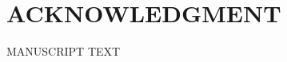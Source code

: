 \documentclass[12pt,english]{article}
\newcommand{\rrxspc}{1.5}
\begin{document}
\doublespacing
\section*{ACKNOWLEDGMENT}
\ACKNOWLEDGMENTS
\clearpage 

\setcounter{page}{1}
\renewcommand*{\thefootnote}{\arabic{footnote}}
\begingroup
  \centering
  \Large MANUSCRIPT TEXT\\[1em]
\endgroup


\pagebreak
\begingroup
{}
\setlength\bibitemsep{5.0pt}
\printbibliography[title=References for Manuscript]
\endgroup
\pagebreak



\appendix
\begin{refsection}

\setcounter{page}{1}
\end{refsection}


\end{document}
